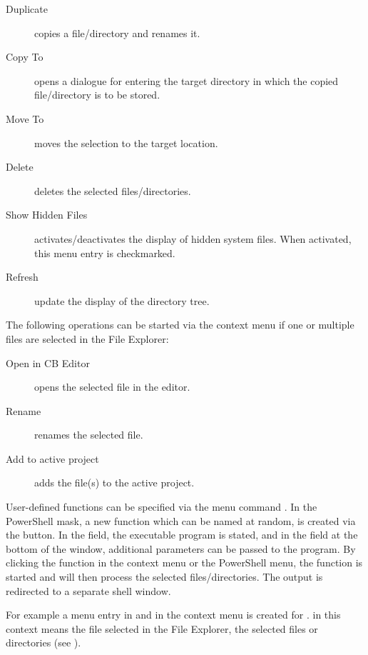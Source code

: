\begin{description}
\item[Duplicate] copies a file/directory and renames it.
\item[Copy To] opens a dialogue for entering the target directory in which the copied file/directory is to be stored.
\item[Move To] moves the selection to the target location.
\item[Delete] deletes the selected files/directories.
\item[Show Hidden Files] activates/deactivates the display of hidden system files. When activated, this menu entry is checkmarked.
\item[Refresh] update the display of the directory tree.
\end{description}

The following operations can be started via the context menu if one or multiple files are selected in the File Explorer:

\begin{description}
\item[Open in CB Editor] opens the selected file in the \codeblocks editor.
\item[Rename] renames the selected file.
\item[Add to active project] adds the file(s) to the active project.
\end{description}


User-defined functions can be specified via the menu command . In the PowerShell mask, a new function which can be named at random, is created via the  button. In the  field, the executable program is stated, and in the field at the bottom of the window, additional parameters can be passed to the program.
By clicking the function in the context menu or the PowerShell menu, the function is started and will then process the selected files/directories. The output is redirected to a separate shell window.

For example a menu entry in  and in the context menu is created for .  in this context means the file selected in the File Explorer,  the selected files or directories (see ).

